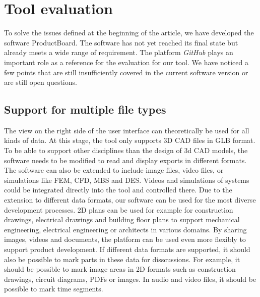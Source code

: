 \section{Tool evaluation}
\label{sec:evaluation}
To solve the issues defined at the beginning of the article, we have developed the software ProductBoard. The software has not yet reached its final state but already meets a wide range of requirement. The platform \textit{GitHub} plays an important role as a reference for the evaluation for our tool.
We have noticed a few points that are still insufficiently covered in the current software version or are still open questions.

\subsection*{Support for multiple file types}
The view on the right side of the user interface can theoretically be used for all kinds of data.
At this stage, the tool only supports 3D CAD files in GLB format. To be able to support other disciplines than the design of 3d CAD models, the software needs to be modified to read and display exports in different formats. The software can also be extended to include image files, video files, or simulations like FEM, CFD, MBS and DES. Videos and simulations of systems could be integrated directly into the tool and controlled there.
Due to the extension to different data formats, our software can be used for the most diverse development processes. 
2D plans can be used for example for construction drawings, electrical drawings and building floor plans to support mechanical engineering, electrical engineering or architects in various domains.
By sharing images, videos and documents, the platform can be used even more flexibly to support product development.
If different data formats are supported, it should also be possible to mark parts in these data for disscussions.
For example, it should be possible to mark image areas in 2D formats such as construction drawings, circuit diagrams, PDFs or images. 
In audio and video files, it should be possible to mark time segments.


